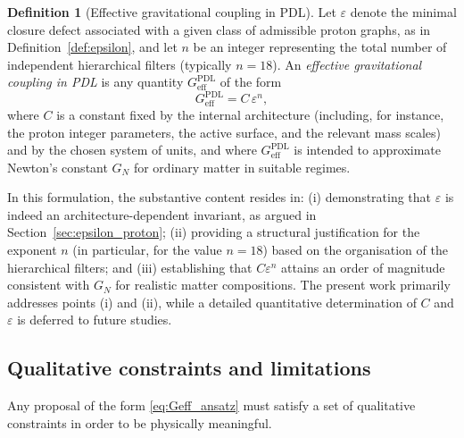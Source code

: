 \documentclass[11pt,a4paper]{article}
\theoremstyle{definition}
\newtheorem{definition}[theorem]{Definition}
\newcommand{\PDL}{\mathrm{PDL}}
\begin{document}
\begin{definition}[Effective gravitational coupling in PDL]
\label{def:Geff_PDL}
Let $\varepsilon$ denote the minimal closure defect associated with a given class of admissible proton graphs, as in Definition~\ref{def:epsilon}, and let $n$ be an integer representing the total number of independent hierarchical filters (typically $n=18$). An \emph{effective gravitational coupling in PDL} is any quantity $G_{\mathrm{eff}}^{\PDL}$ of the form
\[
 G_{\mathrm{eff}}^{\PDL} = C \,\varepsilon^{n},
\]
where $C$ is a constant fixed by the internal architecture (including, for instance, the proton integer parameters, the active surface, and the relevant mass scales) and by the chosen system of units, and where $G_{\mathrm{eff}}^{\PDL}$ is intended to approximate Newton’s constant $G_N$ for ordinary matter in suitable regimes.\cite{Exponent_18_PDL_2026,Effective_Fields_PDL_2026}
\end{definition}

In this formulation, the substantive content resides in: (i) demonstrating that $\varepsilon$ is indeed an architecture-dependent invariant, as argued in Section~\ref{sec:epsilon_proton}; (ii) providing a structural justification for the exponent $n$ (in particular, for the value $n=18$) based on the organisation of the hierarchical filters; and (iii) establishing that $C \varepsilon^{n}$ attains an order of magnitude consistent with $G_N$ for realistic matter compositions.\cite{Exponent_18_PDL_2026,PDL_Global_Mapping_2026} The present work primarily addresses points (i) and (ii), while a detailed quantitative determination of $C$ and $\varepsilon$ is deferred to future studies.

\subsection{Qualitative constraints and limitations}

Any proposal of the form \eqref{eq:Geff_ansatz} must satisfy a set of qualitative constraints in order to be physically meaningful.
\end{document}
